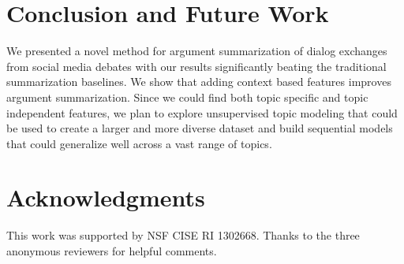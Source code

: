 \documentclass[11pt]{article}
\begin{document}
\section{Conclusion and Future Work}
\label{conc-sec}
We presented a novel method for argument  summarization of dialog exchanges from social media debates with our results significantly beating the traditional summarization baselines. We show that adding context based features improves argument summarization. Since we could find both topic specific and topic independent features, we plan to explore  unsupervised topic modeling that could be used to create a larger and more diverse dataset  and build sequential models that could generalize well  across a vast range of topics.
\section*{Acknowledgments}
This work was supported by NSF CISE RI 1302668. Thanks to the three anonymous reviewers for helpful comments.






\end{document}
